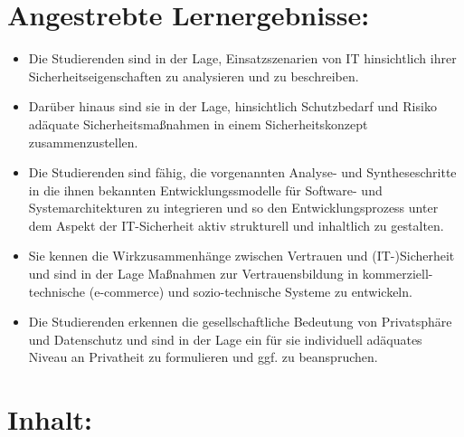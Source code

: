 \section*{Angestrebte
Lernergebnisse:}\label{angestrebte-lernergebnisse-19}

\begin{itemize}
\tightlist
\item
  Die Studierenden sind in der Lage, Einsatzszenarien von IT
  hinsichtlich ihrer Sicherheitseigenschaften zu analysieren und zu
  beschreiben.
\item
  Darüber hinaus sind sie in der Lage, hinsichtlich Schutzbedarf und
  Risiko adäquate Sicherheitsmaßnahmen in einem Sicherheitskonzept
  zusammenzustellen.
\item
  Die Studierenden sind fähig, die vorgenannten Analyse- und
  Syntheseschritte in die ihnen bekannten Entwicklungssmodelle für
  Software- und Systemarchitekturen zu integrieren und so den
  Entwicklungsprozess unter dem Aspekt der IT-Sicherheit aktiv
  strukturell und inhaltlich zu gestalten.
\item
  Sie kennen die Wirkzusammenhänge zwischen Vertrauen und
  (IT-)Sicherheit und sind in der Lage Maßnahmen zur Vertrauensbildung
  in kommerziell-technische (e-commerce) und sozio-technische Systeme zu
  entwickeln.
\item
  Die Studierenden erkennen die gesellschaftliche Bedeutung von
  Privatsphäre und Datenschutz und sind in der Lage ein für sie
  individuell adäquates Niveau an Privatheit zu formulieren und ggf. zu
  beanspruchen.
\end{itemize}

\section*{Inhalt:}\label{inhalt-19}

